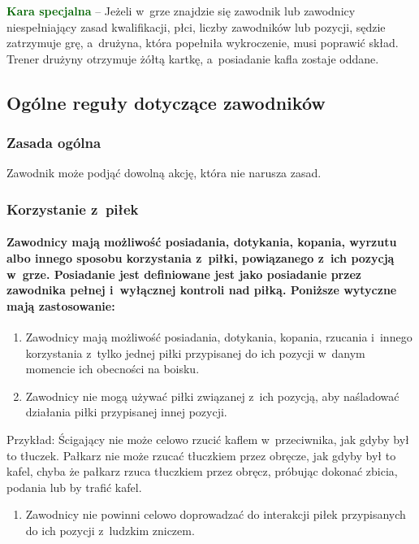 \documentclass[12pt,a4paper]{article}
\newcommand\other[1]{\bgroup\textcolor{darkgreen}{\textbf{#1}}}
\begin{document}
\other{Kara specjalna} -- Jeżeli w~grze znajdzie się zawodnik lub
zawodnicy niespełniający zasad kwalifikacji, płci, liczby zawodników lub
pozycji, sędzie zatrzymuje grę, a~drużyna, która popełniła wykroczenie,
musi poprawić skład. Trener drużyny otrzymuje żółtą kartkę, a~posiadanie
kafla zostaje oddane.

\subsection{Ogólne reguły dotyczące zawodników}

\subsubsection{Zasada ogólna}

Zawodnik może podjąć dowolną akcję, która nie narusza zasad.

\subsubsection{Korzystanie z~piłek}

\paragraph{Zawodnicy mają możliwość posiadania, dotykania,
	kopania, wyrzutu albo innego sposobu korzystania z~piłki, powiązanego z~ich pozycją w~grze. Posiadanie jest definiowane jest jako posiadanie
	przez zawodnika pełnej i~wyłącznej kontroli nad piłką. Poniższe wytyczne
	mają zastosowanie:}

\begin{enumerate}
	\item
	      Zawodnicy mają możliwość posiadania, dotykania, kopania, rzucania i~innego korzystania z~tylko jednej piłki przypisanej do ich pozycji w~danym
	      momencie ich obecności na boisku.
	\item
	      Zawodnicy nie mogą używać piłki związanej z~ich pozycją, aby
	      naśladować działania piłki przypisanej innej pozycji.
\end{enumerate}

Przykład: Ścigający nie może celowo rzucić kaflem w~przeciwnika, jak gdyby był to tłuczek. Pałkarz nie może rzucać tłuczkiem
przez obręcze, jak gdyby był to kafel, chyba że pałkarz rzuca tłuczkiem
przez obręcz, próbując dokonać zbicia, podania lub by trafić kafel.

\begin{enumerate}[resume]
	\item Zawodnicy nie powinni celowo doprowadzać do interakcji piłek
	      przypisanych do ich pozycji z~ludzkim zniczem.
\end{enumerate}
\end{document}
